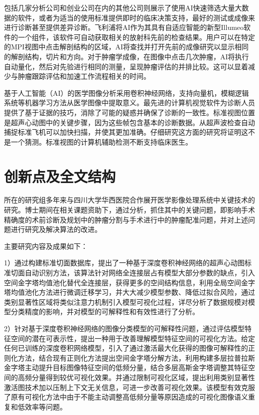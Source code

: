 包括几家分析公司和创业公司在内的其他公司则展示了使用AI快速筛选大量大数据的软件，或者为适当的使用标准提供即时的临床决策支持，最好的测试或成像来进行诊断甚至提供差异诊断。飞利浦将AI作为其具有自适应智能的新型Illumeo软件的一个组件，该软件可自动获取相关的放射科先前的检查结果。用户可以在特定的MPI视图中点击解剖结构的区域，AI将查找并打开先前的成像研究以显示相同的解剖结构，切片和方向。对于肿瘤学成像，在图像中点击几次肿瘤，AI将执行自动量化，然后对先验进行相同的测量，呈现肿瘤评估的并排比较。这可以显着减少与肿瘤跟踪评估和加速工作流程相关的时间。

基于人工智能（AI）的医学图像分析采用卷积神经网络，支持向量机，模糊逻辑系统等机器学习方法从医学图像中提取意义。最先进的计算机视觉软件为诊断人员提供了基于证据的技巧，消除了可能的疑惑并确保了诊断的一致性。标准视图位置是超声心动图中的关键步骤，因为这些帧包含基本的诊断数据。从超声波检查自动捕捉标准飞机可以加快扫描，并使其更加准确。仔细研究这方面的研究将证明这不是一个猜测。标准视图的计算机辅助检测不断支持临床医生。

\section{创新点及全文结构}

所在的研究组多年来与四川大学华西医院合作展开医学影像处理系统中关键技术的研究。博士期间在相关课题资助下，通过分析，抓住其中的关键问题，即影响手术精确度的术前诊断及规划中的肿瘤分割与手术进行中的肿瘤配准问题，并对上述问题进行研究及解决算法的改进。

主要研究内容及成果如下：

1）通过构建标准切面数据库，提出了一种基于深度卷积神经网络的超声心动图标准切面自动识别方法，该算法针对网络全连接层占有模型大部分参数的缺点，引入空间金字塔均值池化替代全连接层，获得更多的空间结构信息，利用全局空间金字塔均值池化方法进行微调迁移学习，并大大减少模型参数、降低过拟合风险，通过类别显著性区域将类似注意力机制引入模型可视化过程，详尽分析了数据规模对模型分类精度的影响，并对模型的可解释性和有效性进行了分析。

2）针对基于深度卷积神经网络的图像分类模型的可解释性问题，通过评估模型特征空间的潜在可表示性，提出一种用于改善理解模型特征空间的可视化方法。给定任何已训练的深度卷积网络模型，引入了通过激活最大化获得的图像可解释性的正则化方法，结合现有正则化方法提出空间金字塔分解方法，利用构建多层拉普拉斯金字塔主动提升目标图像特征空间的低频分量，结合多层高斯金字塔调整其特征空间的高频分量得到较优可视化效果。并通过限制可视化区域，提出利用类别显著性激活图技术加以压制上下文无关信息，可进一步改善可视化效果。该模型有效克服了原有可视化方法中由于不能主动调整高低频分量等原因造成的可视化图像语义重复和低效率等问题。

